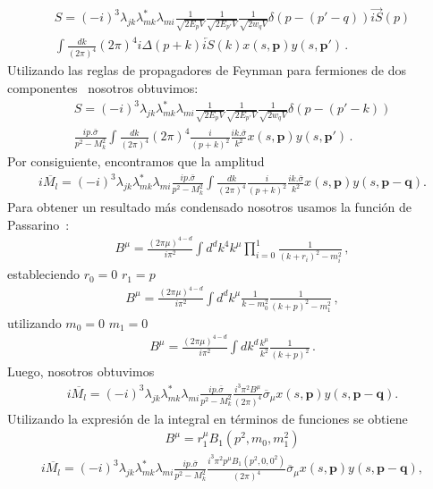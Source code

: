 \begin{align}
S=(-i)^3\lambda_{jk}\lambda^*_{mk}\lambda_{mi}\frac{1}{\sqrt{2E_p V}}\frac{1}{\sqrt{2E_{p'} V}}\frac{1}{\sqrt{2w_qV}}\delta(p-(p'-q))\overrightarrow{iS}(p)\nonumber \\ \int \frac{dk}{(2\pi)^4}(2\pi)^4i\Delta(p+k)\overleftarrow{iS}(k)x(s,\boldsymbol{p})y(s,\boldsymbol{p'})\, .
\end{align}
Utilizando las reglas de propagadores de Feynman para fermiones de dos componentes~\cite{Dreiner:2008tw} nosotros obtuvimos:
\begin{align}
S={(-i)^3}\lambda_{jk}\lambda^*_{mk}\lambda_{mi}\frac{1}{\sqrt{2E_p V}}\frac{1}{\sqrt{2E_{p'} V}}\frac{1}{\sqrt{2w_q V}}\delta(p-(p'-k))\\
\frac{ip.\bar{\sigma}}{p^2-M_{k}^2}\int \frac{dk}{(2\pi)^4} (2\pi)^4\frac{i}{(p+k)^2}\frac{ik.\bar{\sigma}}{k^2}x(s,\boldsymbol{p})y(s,\boldsymbol{p'})\, .
\end{align}
Por consiguiente, encontramos que la amplitud 
\begin{align}
i\overline{M_{l}}={(-i)^3}\lambda_{jk}\lambda^*_{mk}\lambda_{mi}
\frac{ip.\bar{\sigma}}{p^2-M_{k}^2}\int \frac{dk}{(2\pi)^4}\frac{i}{(p+k)^2}\frac{ik.\bar{\sigma}}{k^2}x(s,\boldsymbol{p})y(s,\boldsymbol{p-q}).
\end{align}
Para obtener un resultado más condensado nosotros usamos la función de Passarino~\cite{romao:2006}:
\begin{align}
\label{p1}
B^{\mu}=\frac{(2\pi\mu)^{4-d}}{i\pi^2}\int d^{d}k^4k^{\mu}\prod_{i=0}^{1}\frac{1}{(k+r_{i})^2-m_{i}^2}\,,
\end{align}
estableciendo $r_{0}=0$ $r_{1}=p$
\begin{align}
\label{p2}
B^{\mu}=\frac{(2\pi\mu)^{4-d}}{i\pi^2}\int d^{d}k^{\mu}\frac{1}{k-m_{0}^2}\frac{1}{(k+p)^2-m_{1}^2}\,,
\end{align}
utilizando $m_{0}=0$ $m_{1}=0$
\begin{align}
\label{p3}
B^{\mu}=\frac{(2\pi\mu)^{4-d}}{i\pi^2}\int dk^{d}\frac{k^{\mu}}{k^2}\frac{1}{(k+p)^2}\,.
\end{align}
Luego, nosotros obtuvimos
\begin{align}
i\overline{M_{l}}={(-i)^3}\lambda_{jk}\lambda^*_{mk}\lambda_{mi}
\frac{ip.\bar{\sigma}}{p^2-M_{k}^2}\frac{i^3\pi^2B^\mu}{(2\pi)^4}{\overline{\sigma}}_{\mu} x(s,\boldsymbol{p})y(s,\boldsymbol{p-q}).
\end{align}
Utilizando la expresión de la integral en términos de funciones se obtiene~\cite{romao:2006}
\begin{align}
\label{p4}
B^{\mu}=r_{1}^{\mu}B_{1}(p^2,m_{0},m_{1}^2)
\end{align}
\begin{align}
i\overline{M_{l}}={(-i)^3}\lambda_{jk}\lambda^*_{mk}\lambda_{mi}
\frac{ip.\bar{\sigma}}{p^2-M_{k}^2}\frac{i^3\pi^2p^{\mu}B_{1}(p^2,0,0^2)}{(2\pi)^4}{\overline{\sigma}}_{\mu} x(s,\boldsymbol{p})y(s,\boldsymbol{p-q}),
\end{align}

